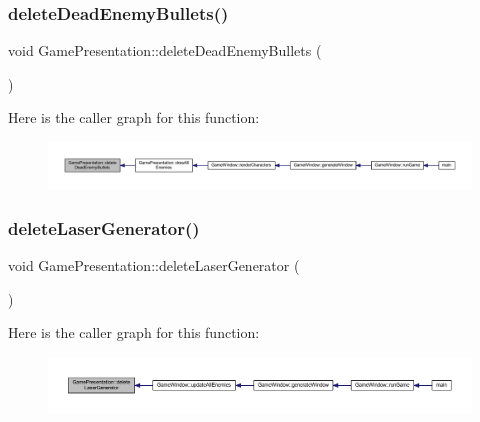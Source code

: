 \subsubsection{\texorpdfstring{delete\+Dead\+Enemy\+Bullets()}{deleteDeadEnemyBullets()}}
{\footnotesize\ttfamily void Game\+Presentation\+::delete\+Dead\+Enemy\+Bullets (\begin{DoxyParamCaption}{ }\end{DoxyParamCaption})}

Here is the caller graph for this function\+:\nopagebreak
\begin{figure}[H]
\begin{center}
\leavevmode
\includegraphics[width=350pt]{class_game_presentation_acc8d59152c26b9dddc84081c5a4483f2_icgraph}
\end{center}
\end{figure}
\mbox{\label{class_game_presentation_aebd299a3aa0c8e7a06d63f5cbc808c7d}} 
\subsubsection{\texorpdfstring{delete\+Laser\+Generator()}{deleteLaserGenerator()}}
{\footnotesize\ttfamily void Game\+Presentation\+::delete\+Laser\+Generator (\begin{DoxyParamCaption}{ }\end{DoxyParamCaption})}

Here is the caller graph for this function\+:\nopagebreak
\begin{figure}[H]
\begin{center}
\leavevmode
\includegraphics[width=350pt]{class_game_presentation_aebd299a3aa0c8e7a06d63f5cbc808c7d_icgraph}
\end{center}
\end{figure}
\mbox{\label{class_game_presentation_acd19622d7ee0ae8b898f5805ae94f2b4}} 
